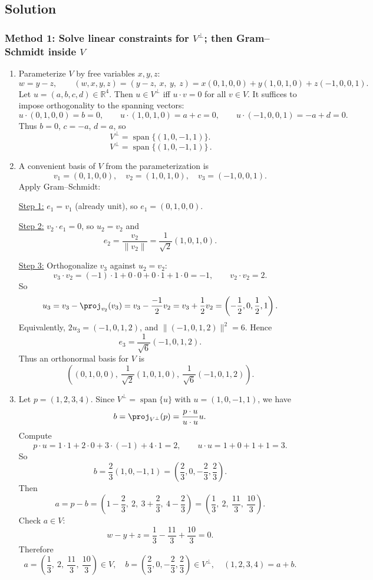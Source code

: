 \documentclass[12pt]{article}
\newcommand{\R}{\mathbb{R}}
\DeclareMathOperator{\Span}{span}
\begin{document}
\subsection{Solution}

\subsubsection{Method 1: Solve linear constraints for $V^\perp$; then Gram--Schmidt inside $V$}
\begin{enumerate}[label=(\alph*)]
\item Parameterize $V$ by free variables $x,y,z$:
\[
w=y-z,\qquad (w,x,y,z)=(y-z,\ x,\ y,\ z)=x(0,1,0,0)+y(1,0,1,0)+z(-1,0,0,1).
\]
Let $u=(a,b,c,d)\in\R^4$. Then $u\in V^\perp$ iff $u\cdot v=0$ for all $v\in V$.
It suffices to impose orthogonality to the spanning vectors:
\[
u\cdot(0,1,0,0)=b=0,\qquad
u\cdot(1,0,1,0)=a+c=0,\qquad
u\cdot(-1,0,0,1)=-a+d=0.
\]
Thus $b=0$, $c=-a$, $d=a$, so
\[
V^\perp=\Span\{(1,0,-1,1)\}.
\]
\[
\boxed{\,V^\perp=\Span\{(1,0,-1,1)\}\,}.
\]

\item A convenient basis of $V$ from the parameterization is
\[
v_1=(0,1,0,0),\quad v_2=(1,0,1,0),\quad v_3=(-1,0,0,1).
\]
Apply Gram--Schmidt:

\underline{Step 1:} $e_1=v_1$ (already unit), so $e_1=(0,1,0,0)$.

\underline{Step 2:} $v_2\cdot e_1=0$, so $u_2=v_2$ and
\[
e_2=\frac{v_2}{\|v_2\|}=\frac{1}{\sqrt2}(1,0,1,0).
\]

\underline{Step 3:} Orthogonalize $v_3$ against $u_2=v_2$:
\[
v_3\cdot v_2=(-1)\cdot 1+0\cdot 0+0\cdot 1+1\cdot 0=-1,\qquad v_2\cdot v_2=2.
\]
So
\[
u_3=v_3-\proj_{v_2}(v_3)=v_3-\frac{-1}{2}v_2=v_3+\frac12 v_2=\left(-\frac12,0,\frac12,1\right).
\]
Equivalently, $2u_3=(-1,0,1,2)$, and $\|(-1,0,1,2)\|^2=6$. Hence
\[
e_3=\frac{1}{\sqrt6}(-1,0,1,2).
\]
Thus an orthonormal basis for $V$ is
\[
\boxed{\,
\left(
(0,1,0,0),\ \frac{1}{\sqrt2}(1,0,1,0),\ \frac{1}{\sqrt6}(-1,0,1,2)
\right).
\,}
\]

\item Let $p=(1,2,3,4)$. Since $V^\perp=\Span\{u\}$ with $u=(1,0,-1,1)$, we have
\[
b=\proj_{V^\perp}(p)=\frac{p\cdot u}{u\cdot u}u.
\]
Compute
\[
p\cdot u=1\cdot 1+2\cdot 0+3\cdot(-1)+4\cdot 1=2,\qquad u\cdot u=1+0+1+1=3.
\]
So
\[
b=\frac{2}{3}(1,0,-1,1)=\left(\frac23,0,-\frac23,\frac23\right).
\]
Then
\[
a=p-b=\left(1-\frac23,\ 2,\ 3+\frac23,\ 4-\frac23\right)=\left(\frac13,\ 2,\ \frac{11}{3},\ \frac{10}{3}\right).
\]
Check $a\in V$:
\[
w-y+z=\frac13-\frac{11}{3}+\frac{10}{3}=0.
\]
Therefore
\[
\boxed{\,
a=\left(\frac13,\ 2,\ \frac{11}{3},\ \frac{10}{3}\right)\in V,
\quad
b=\left(\frac23,0,-\frac23,\frac23\right)\in V^\perp,
\quad
(1,2,3,4)=a+b.
\,}
\]
\end{enumerate}
\end{document}
